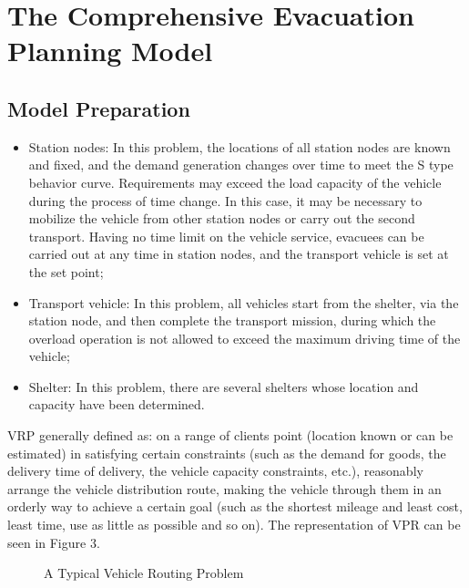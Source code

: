 \documentclass{mcmthesis}
\begin{document}
\section{The Comprehensive Evacuation Planning Model}
\subsection{Model Preparation}

\begin{itemize}

\item Station nodes: In this problem, the locations of all station nodes are known and fixed, and the demand generation changes over time to meet the S type behavior curve. Requirements may exceed the load capacity of the vehicle during the process of time change. In this case, it may be necessary to mobilize the vehicle from other station nodes or carry out the second transport. Having no time limit on the vehicle service, evacuees can be carried out at any time in station nodes, and the transport vehicle is set at the set point;
\item Transport vehicle: In this problem, all vehicles start from the shelter, via the station node, and then complete the transport mission, during which the overload operation is not allowed to exceed the maximum driving time of the vehicle;

\item Shelter: In this problem, there are several shelters whose location and capacity have been determined.
\end{itemize}

VRP \cite{Dikas2016Solving,He2015Model} generally defined as: on a range of clients point (location known or can be estimated) in satisfying certain constraints (such as the demand for goods, the delivery time of delivery, the vehicle capacity constraints, etc.), reasonably arrange the vehicle distribution route, making the vehicle through them in an orderly way to achieve a certain goal (such as the shortest mileage and least cost, least time, use as little as possible and so on). The representation of VPR can be seen in Figure 3.

\begin{figure}[tbp]
  \caption{A Typical Vehicle Routing Problem}\label{Figure3}
\end{figure}
\end{document}
